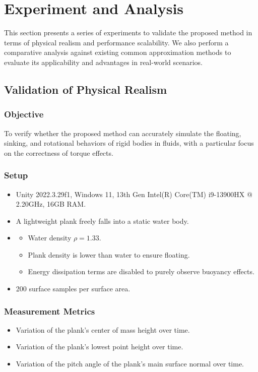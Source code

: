\section{Experiment and Analysis}

This section presents a series of experiments to validate the proposed method in terms of physical realism and performance scalability. We also perform a comparative analysis against existing common approximation methods to evaluate its applicability and advantages in real-world scenarios.

\subsection*{Validation of Physical Realism}

\subsubsection*{Objective}
To verify whether the proposed method can accurately simulate the floating, sinking, and rotational behaviors of rigid bodies in fluids, with a particular focus on the correctness of torque effects.

\subsubsection*{Setup}
\begin{itemize}
		\item {} Unity 2022.3.29f1, Windows 11, 13th Gen Intel(R) Core(TM) i9-13900HX @ 2.20GHz, 16GB RAM.
		\item {} A lightweight plank freely falls into a static water body.
		\item {}
		\begin{itemize}
				\item Water density $\rho = 1.33$.
				\item Plank density is lower than water to ensure floating.
				\item Energy dissipation terms are disabled to purely observe buoyancy effects.
		\end{itemize}
		\item {} 200 surface samples per surface area.
\end{itemize}

\subsubsection*{Measurement Metrics}
\begin{itemize}
		\item Variation of the plank's center of mass height over time.
		\item Variation of the plank's lowest point height over time.
		\item Variation of the pitch angle of the plank's main surface normal over time.
\end{itemize}

